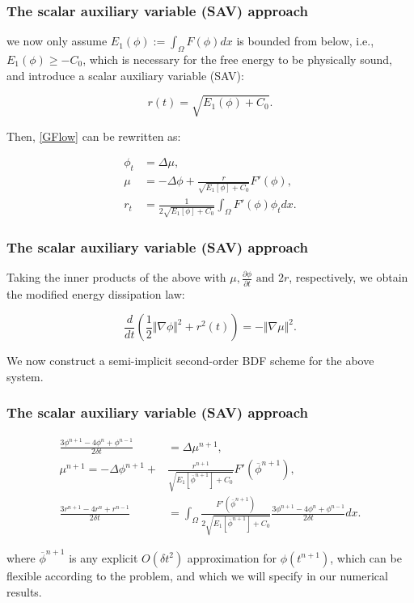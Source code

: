 \documentclass{beamer}
\begin{document}
    \begin{frame}
    \frametitle{The scalar auxiliary variable (SAV) approach}

we now only assume $E_1(\phi):=\int_{\Omega}F(\phi)dx$ is bounded from below, i.e., $E_1(\phi)\geq−C_0$, which is necessary for the free energy to be physically sound, and
introduce a scalar auxiliary variable (SAV):

$$
r(t)=\sqrt{E_1(\phi)+C_0}.
$$

Then, \ref{GFlow} can be rewritten as:

\begin{equation}\label{SAV}
  \begin{split}
\phi_t&=\Delta\mu,\\
\mu&=-\Delta\phi+\frac{r}{\sqrt{E_1[\phi]+C_0}}F'(\phi),\\
r_t&=\frac{1}{2\sqrt{E_1[\phi]+C_0}}\int_{\Omega}F'(\phi)\phi_t dx.
  \end{split}
\end{equation}

    \end{frame}
    \begin{frame}
\frametitle{The scalar auxiliary variable (SAV) approach}

Taking the inner products of the above with $\mu, \frac{\partial\phi}{\partial t}\text{ and }2r$, respectively, we obtain the modified energy dissipation law:

$$
\frac{d}{dt}(\frac{1}{2}\Vert\nabla\phi\Vert^2+r^2(t))=-\Vert\nabla\mu\Vert^2.
$$

We now construct a semi-implicit second-order BDF scheme for the above system.

    \end{frame}
    \begin{frame}
\frametitle{The scalar auxiliary variable (SAV) approach}

\begin{equation}\label{SAV-BDF2}
  \begin{split}
\frac{3\phi^{n+1}-4\phi^n+\phi^{n-1}}{2\delta t}&=\Delta\mu^{n+1},\\
\mu^{n+1}=-\Delta\phi^{n+1}+&\frac{r^{n+1}}{\sqrt{E_1[\overline{\phi}^{n+1}]+C_0}}F'(\overline{\phi}^{n+1}),\\
\frac{3r^{n+1}-4r^n+r^{n-1}}{2\delta t}&=\int_{\Omega}\frac{F'(\overline{\phi}^{n+1})}{2\sqrt{E_1[\overline{\phi}^{n+1}]+C_0}}\frac{3\phi^{n+1}-4\phi^n+\phi^{n-1}}{2\delta t} dx.
  \end{split}
\end{equation}

where $\overline{\phi}^{n+1}$ is any explicit $O(\delta t^2)$ approximation for $\phi(t^{n+1})$, which can be flexible according to the problem, and which we will specify in our numerical results.

    \end{frame}
\end{document}
